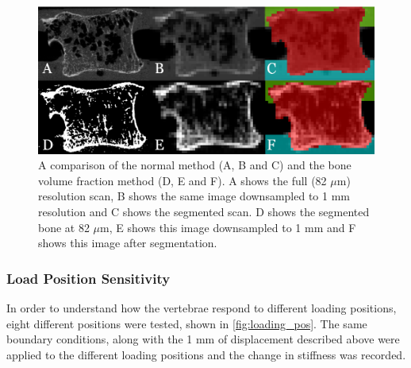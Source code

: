 \begin{figure}[ht!]
\centering
\includegraphics[width=.65\textwidth]{Chapters/Chapter_HT_images/normal_vs_bvtv_seg.png}
	\caption{A comparison of the normal method (A, B and C) and the bone volume fraction method (D, E and F). A shows the full (82 $\mu$m) resolution scan, B shows the same image downsampled to 1 mm resolution and C shows the segmented scan. D shows the segmented bone at 82 $\mu$m, E shows this image downsampled to 1 mm and F shows this image after segmentation.}
\label{fig:normal_vs_bv_tv_seg}
\end{figure}






\subsubsection{Load Position Sensitivity}

In order to understand how the vertebrae respond to different loading positions, eight different positions were tested, shown in \cref{fig:loading_pos}. The same boundary conditions, along with the 1 mm of displacement described above were applied to the different loading positions and the change in stiffness was recorded.

